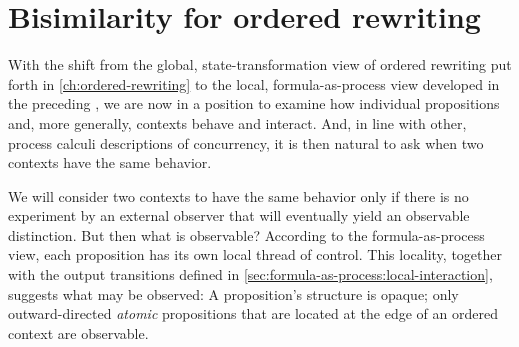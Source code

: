 \chapter{Bisimilarity for ordered rewriting}\label{ch:ordered-bisimilarity}

With the shift from the global, state-transformation view of ordered rewriting put forth in \cref{ch:ordered-rewriting} to the local, formula-as-process view developed in the preceding , we are now in a position to examine how individual propositions and, more generally, contexts behave and interact.
And, in line with other, process calculi descriptions of concurrency, it is then natural to ask when two contexts have the same behavior.

We will consider two contexts to have the same behavior only if there is no experiment by an external observer that will eventually yield an observable distinction.
But then what is observable?
According to the formula-as-process view, each proposition has its own local thread of control.
This locality, together with the output transitions defined in \cref{sec:formula-as-process:local-interaction}, suggests what may be observed:
A proposition's structure is opaque; only outward-directed \emph{atomic} propositions that are located at the edge of an ordered context are observable.


